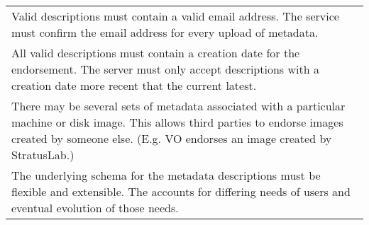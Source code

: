 \begin{table}
\begin{center}
\begin{tabular}{p{}}
\\ Valid descriptions must contain a valid email address.  The
  service must confirm the email address for every upload of metadata.

\\ All valid descriptions must contain a creation date for the
  endorsement.  The server must only accept descriptions with a
  creation date more recent that the current latest.

\\ There may be several sets of metadata associated with a
  particular machine or disk image. This allows third parties to
  endorse images created by someone else. (E.g. VO endorses an image
  created by StratusLab.)

\\ The underlying schema for the metadata descriptions must be
  flexible and extensible.  The accounts for differing needs of users
  and eventual evolution of those needs.

\\
\hline\hline
\end{tabular}
\end{center}
\end{table}
